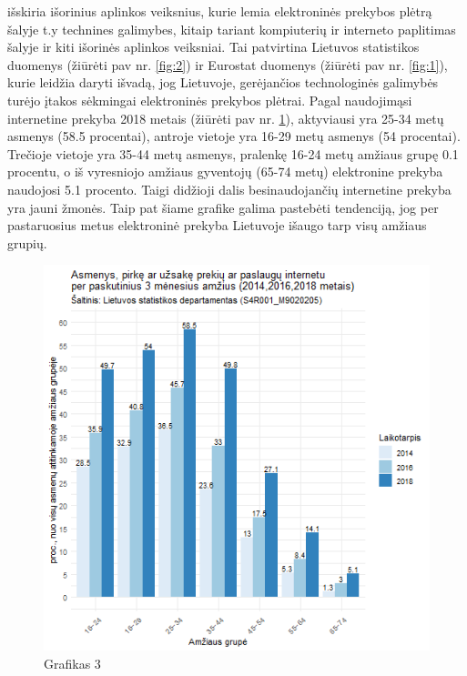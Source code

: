 \documentclass[12pt, titlepage]{article}
\begin{document}
\smallskip
\par
\textcite{pabedinskaite2012vartotojku} išskiria išorinius aplinkos veiksnius, kurie lemia elektroninės prekybos plėtrą šalyje t.y technines galimybes, kitaip tariant kompiuterių ir interneto paplitimas šalyje ir kiti išorinės aplinkos veiksniai. Tai patvirtina Lietuvos statistikos duomenys (žiūrėti pav nr. \ref{fig:2}) ir Eurostat duomenys (žiūrėti pav nr. \ref{fig:1}), kurie leidžia daryti išvadą, jog Lietuvoje, gerėjančios technologinės galimybės turėjo įtakos sėkmingai elektroninės prekybos plėtrai. Pagal naudojimąsi internetine prekyba 2018 metais (žiūrėti pav nr. \ref{fig:4}), aktyviausi yra 25-34 metų asmenys (58.5 procentai), antroje vietoje yra 16-29 metų asmenys (54 procentai). Trečioje vietoje yra 35-44 metų asmenys, pralenkę 16-24 metų amžiaus grupę 0.1 procentu, o iš vyresniojo amžiaus gyventojų (65-74 metų) elektronine prekyba naudojosi 5.1 procento. Taigi didžioji dalis besinaudojančių internetine prekyba yra jauni žmonės. Taip pat šiame grafike galima pastebėti tendenciją, jog per pastaruosius metus elektroninė prekyba Lietuvoje išaugo tarp visų amžiaus grupių.
\begin{figure}[H]
\center
\includegraphics[scale=0.8]{Grafikai/3.png} 
\caption{Grafikas 3}
\label{fig:4}
\end{figure}
\medskip
\par
\end{document}
